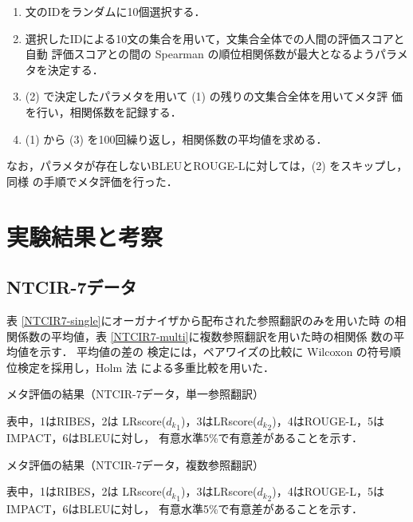 \documentclass[japanese]{jnlp_1.4}
\begin{document}
\begin{enumerate}
 \item 文のIDをランダムに10個選択する．
 \item 選択したIDによる10文の集合を用いて，文集合全体での人間の評価スコアと自動
       評価スコアとの間の Spearman の順位相関係数が最大となるようパラメタを決定する．
 \item (2) で決定したパラメタを用いて (1) の残りの文集合全体を用いてメタ評
       価を行い，相関係数を記録する．
 \item (1) から (3) を100回繰り返し，相関係数の平均値を求める．
\end{enumerate}

なお，パラメタが存在しないBLEUとROUGE-Lに対しては，(2) をスキップし，同様
の手順でメタ評価を行った．


\section{実験結果と考察}

\subsection{NTCIR-7データ}

表 \ref{NTCIR7-single}にオーガナイザから配布された参照翻訳のみを用いた時
の相関係数の平均値，表 \ref{NTCIR7-multi}に複数参照翻訳を用いた時の相関係
数の平均値を示す．
平均値の差の
検定には，ペアワイズの比較に Wilcoxon の符号順位検定\cite{wilcox}を採用し，Holm
法 \cite{holm} による多重比較を用いた．

\begin{table}[t]
  \caption{メタ評価の結果（NTCIR-7データ，単一参照翻訳）}
  \label{NTCIR7-single}

\vspace{4pt}\small
表中，1はRIBES，2は
  LRscore(${d_k}_1$)，3はLRscore(${d_k}_2$)，4はROUGE-L，5はIMPACT，6はBLEUに対し，
  有意水準5\%で有意差があることを示す．
\par
\end{table}
\begin{table}[t]
  \caption{メタ評価の結果（NTCIR-7データ，複数参照翻訳）}
  \label{NTCIR7-multi}

\vspace{4pt}\small
表中，1はRIBES，2は
  LRscore(${d_k}_1$)，3はLRscore(${d_k}_2$)，4はROUGE-L，5はIMPACT，6はBLEUに対し，
  有意水準5\%で有意差があることを示す．
\par
\end{table}
\end{document}
